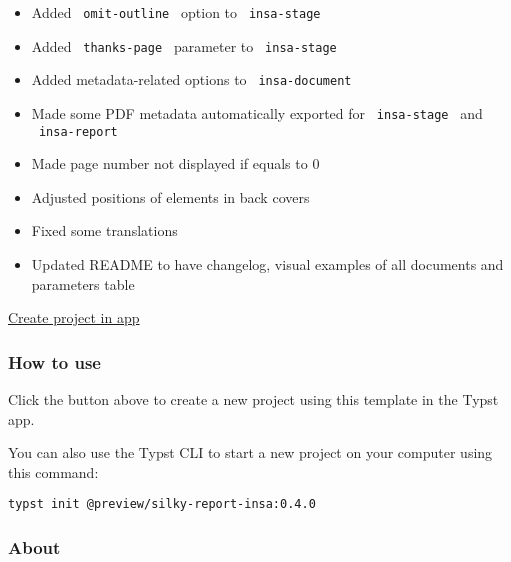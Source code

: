 \begin{itemize}
\tightlist
\item
  Added \texttt{\ omit-outline\ } option to \texttt{\ insa-stage\ }
\item
  Added \texttt{\ thanks-page\ } parameter to \texttt{\ insa-stage\ }
\item
  Added metadata-related options to \texttt{\ insa-document\ }
\item
  Made some PDF metadata automatically exported for
  \texttt{\ insa-stage\ } and \texttt{\ insa-report\ }
\item
  Made page number not displayed if equals to 0
\item
  Adjusted positions of elements in back covers
\item
  Fixed some translations
\item
  Updated README to have changelog, visual examples of all documents and
  parameters table
\end{itemize}

\href{/app?template=silky-report-insa&version=0.4.0}{Create project in
app}

\subsubsection{How to use}\label{how-to-use}

Click the button above to create a new project using this template in
the Typst app.

You can also use the Typst CLI to start a new project on your computer
using this command:

\begin{verbatim}
typst init @preview/silky-report-insa:0.4.0
\end{verbatim}



\subsubsection{About}\label{about}

